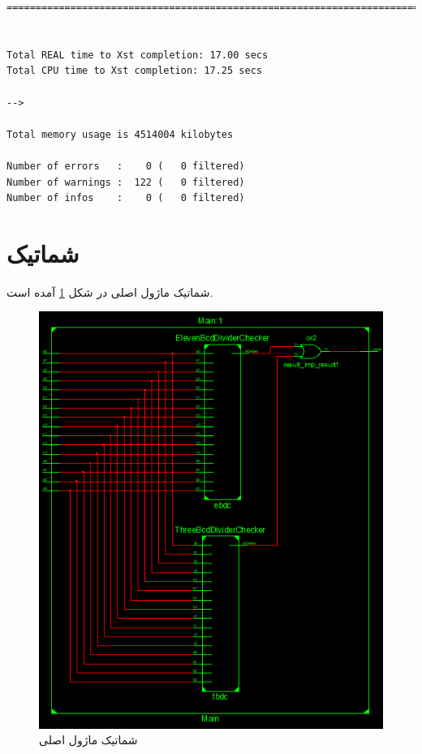 \documentclass[fleqn]{article}
\begin{document}
\begin{latin}
\begin{lstlisting}[basicstyle=\tiny]
=========================================================================


Total REAL time to Xst completion: 17.00 secs
Total CPU time to Xst completion: 17.25 secs

--> 

Total memory usage is 4514004 kilobytes

Number of errors   :    0 (   0 filtered)
Number of warnings :  122 (   0 filtered)
Number of infos    :    0 (   0 filtered)
\end{lstlisting}
\end{latin}

\section{شماتیک}
شماتیک ماژول اصلی در شکل 
\ref{main}
آمده است.
\begin{figure}[H]
	\centering
	\includegraphics[width=.5\paperwidth]{./Schematic/Main.png}
	\caption{شماتیک ماژول اصلی}
	\label{main}
\end{figure}
\end{document}
